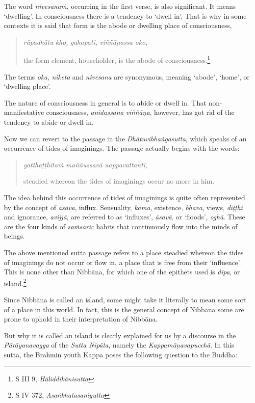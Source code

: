 The word \emph{nivesanaṁ}, occurring in the first verse, is also significant. It means `dwelling'. In consciousness there is a tendency to `dwell in'. That is why in some contexts it is said that form is the abode or dwelling place of consciousness,

\begin{quote}
\emph{rūpadhātu kho, gahapati, viññāṇassa oko,}

the form element, householder, is the abode of consciousness.\footnote{S III 9, \emph{Hāliddikānisutta}}
\end{quote}

The terms \emph{oka, niketa} and \emph{nivesana} are synonymous, meaning `abode', `home', or `dwelling place'.

The nature of consciousness in general is to abide or dwell in. That non-manifestative consciousness, \emph{anidassana viññāṇa}, however, has got rid of the tendency to abide or dwell in.

Now we can revert to the passage in the \emph{Dhātuvibhaṅgasutta}, which speaks of an occurrence of tides of imaginings. The passage actually begins with the words:

\begin{quote}
\emph{yatthaṭṭhitaṁ maññussavā nappavattanti},

steadied whereon the tides of imaginings occur no more in him.
\end{quote}

The idea behind this occurrence of tides of imaginings is quite often represented by the concept of \emph{āsava}, influx. Sensuality, \emph{kāma}, existence, \emph{bhava}, views, \emph{diṭṭhi} and ignorance, \emph{avijjā}, are referred to as `influxes', \emph{āsavā}, or `floods', \emph{oghā}. These are the four kinds of \emph{saṁsāric} habits that continuously flow into the minds of beings.

The above mentioned sutta passage refers to a place steadied whereon the tides of imaginings do not occur or flow in, a place that is free from their `influence'. This is none other than Nibbāna, for which one of the epithets used is \emph{dīpa}, or island.\footnote{S IV 372, \emph{Asaṅkhatasaṁyutta}}

Since Nibbāna is called an island, some might take it literally to mean some sort of a place in this world. In fact, this is the general concept of Nibbāna some are prone to uphold in their interpretation of Nibbāna.

But why it is called an island is clearly explained for us by a discourse in the \emph{Pārāyanavagga} of the \emph{Sutta Nipāta}, namely the \emph{Kappamāṇavapucchā}. In this sutta, the Brahmin youth Kappa poses the following question to the Buddha:

